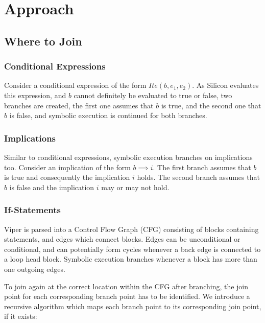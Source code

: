 \documentclass[11pt]{article}
\begin{document}
    \section{Approach}

    \subsection{Where to Join}

    \subsubsection{Conditional Expressions}

    Consider a conditional expression of the form $Ite(b, e_1, e_2)$.
    As Silicon evaluates this expression, and $b$ cannot definitely be evaluated to true or false,
    two branches are created, the first one assumes that $b$
    is true, and the second one that $b$ is false, and symbolic execution is continued for both branches.


    \subsubsection{Implications}

    Similar to conditional expressions, symbolic execution branches on implications too. Consider
    an implication of the form $b \implies i$. The first branch assumes that $b$ is true and
    consequently the implication $i$ holds. The second branch assumes that $b$ is false and the
    implication $i$ may or may not hold. 

    \subsubsection{If-Statements} \label{approach:if-statements}

    Viper is parsed into a Control Flow Graph (CFG) consisting of blocks containing
    statements, and edges which connect blocks. Edges can be unconditional or conditional,
    and can potentially form cycles whenever a back edge is connected to a loop head block.
    Symbolic execution branches whenever a block has more than one outgoing edges.

    To join again at the correct location within the CFG after branching,
    the join point for each corresponding branch point has to be identified.
    We introduce a recursive algorithm which maps each branch point to its corresponding join point,
    if it exists:
\end{document}
